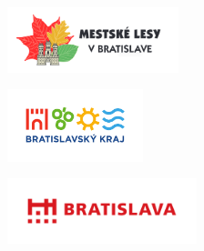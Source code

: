 \documentclass[a4paper,12pt]{article}
\begin{document}
\begin{figure}[h!]
\centering
\begin{subfigure}{0.30\textwidth}
\centering
\includegraphics[height=1.9cm]{logo_lesyBA.png}
\end{subfigure}
\begin{subfigure}{0.30\textwidth}
\centering
\includegraphics[height=2.1cm]{logo_BSK.pdf}
\end{subfigure}
\begin{subfigure}{0.30\textwidth}
\centering
\includegraphics[height=1.9cm]{logo_BA.pdf}
\end{subfigure}
\end{figure}
\end{document}

